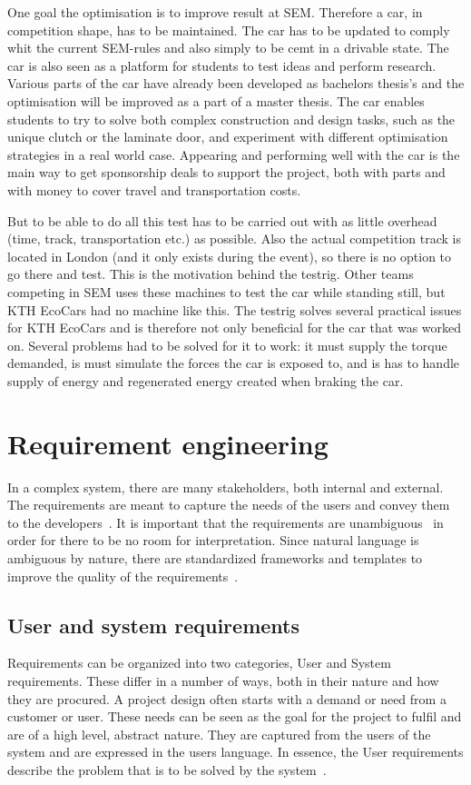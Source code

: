 One goal the optimisation is to improve result at SEM\@. Therefore a car, in competition shape, has to be maintained. The car has to be updated to comply whit the current SEM-rules and also simply to be cemt in a drivable state. The car is also seen as a platform for students to test ideas and perform research. Various parts of the car have already been developed as bachelors thesis's and the optimisation will be improved as a part of a master thesis. The car enables students to try to solve both complex construction and design tasks, such as the unique clutch or the laminate door, and experiment with different optimisation strategies in a real world case. Appearing and performing well with the car is the main way to get sponsorship deals to support the project, both with parts and with money to cover travel and transportation costs.

But to be able to do all this test has to be carried out with as little overhead (time, track, transportation etc.) as possible. Also the actual competition track is located in London (and it only exists during the event), so there is no option to go there and test. This is the motivation behind the testrig. Other teams competing in SEM uses these machines to test the car while standing still, but KTH EcoCars had no machine like this. The testrig solves several practical issues for KTH EcoCars and is therefore not only beneficial for the car that was worked on. Several problems had to be solved for it to work: it must supply the torque demanded, is must simulate the forces the car is exposed to, and is has to handle supply of energy and regenerated energy created when braking the car.

\section{Requirement engineering}
In a complex system, there are many stakeholders, both internal and external.
The requirements are meant to capture the needs of the users and convey them to
the developers~\cite{ibm_req}. It is important that the requirements are
unambiguous~\cite{ibm_req, rupp2014} in order for there to be no room for
interpretation. Since natural language is ambiguous by nature, there are
standardized frameworks and templates to improve the quality of the
requirements~\cite{rupp2014}. 

\subsection{User and system requirements}\label{sec:req_usr_sys}
Requirements can be organized into two categories, User and System requirements.
These differ in a number of ways, both in their nature and how they are
procured. A project design often starts with a demand or need from a customer or user.
These needs can be seen as the goal for the project to fulfil and are of a high
level, abstract nature. They are captured from the users of the system
and are expressed in the users language. In essence, the User requirements
describe the problem that is to be solved by the system~\cite{ibm_req}. 


